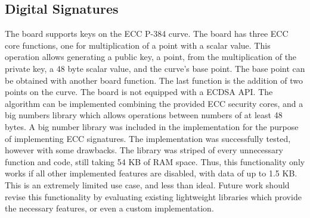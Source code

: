 




\subsection{Digital Signatures}\label{chap:implementation:services:signatures}

The board supports keys on the \ac{ECC} P-384 curve. The board has three \ac{ECC} core functions, one for multiplication of a point with a scalar value. This operation allows generating a public key, a point, from the multiplication of the private key, a 48 byte scalar value, and the curve's base point. The base point can be obtained with another board function.
The last function is the addition of two points on the curve.
The board is not equipped with a \ac{ECDSA} API. The algorithm can be implemented combining the provided ECC security cores, and a big numbers library which allows operations between numbers of at least 48 bytes.
A big number library was included in the implementation for the purpose of implementing ECC signatures. The implementation was successfully tested, however with some drawbacks.
The library was striped of every unnecessary function and code, still taking 54 KB of RAM space. Thus, this functionality only works if all other implemented features are disabled, with data of up to 1.5 KB.
This is an extremely limited use case, and less than ideal. Future work should revise this functionality by evaluating existing lightweight libraries which provide the necessary features, or even a custom implementation.

